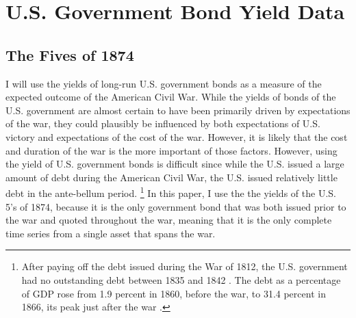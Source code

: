 \section{U.S. Government Bond Yield Data}
\label{sec:why-prices-study}



\subsection{The Fives of 1874}
\label{sec:5s-1874}

I will use the yields of long-run U.S. government bonds as a measure of the expected outcome of the American Civil War.
While the yields of bonds of the U.S. government are almost certain to have been primarily driven by expectations of the war, they could plausibly be influenced by both expectations of U.S. victory and expectations of the cost of the war.
However, it is likely that the cost and duration of the war is the more important of those factors.
However, using the yield of U.S. government bonds is difficult since while the U.S. issued a large amount of debt during the American Civil War, the U.S. issued relatively little debt in the ante-bellum period.%
\footnote{
  After paying off the debt issued during the War of 1812, the U.S. government had no outstanding debt between 1835 and 1842 \parencite[297]{HomerSylla2005}.
  The debt as a percentage of GDP rose from 1.9 percent in 1860, before the war, to 31.4 percent in 1866, its peak just after the war \parencites{CBO2012}{CBO2012a}.
}
In this paper, I use the the yields of the U.S. 5's of 1874, because it is the only government bond that was both issued prior to the war and quoted throughout the war, meaning that it is the only complete time series from a single asset that spans the war.

